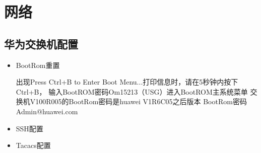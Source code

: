 \documentclass[a4paper,10pt,english]{sphinxmanual}
\begin{document}
\chapter{网络}
\label{\detokenize{network/index:id1}}\label{\detokenize{network/index::doc}}

\section{华为交换机配置}
\label{\detokenize{network/huawei:id1}}\label{\detokenize{network/huawei::doc}}\begin{itemize}
\item {} 
BootRom重置

\begin{sphinxVerbatim}[commandchars=\\\{\}]
出现\PYGZdq{}Press Ctrl+B to Enter Boot Menu...\PYGZdq{}打印信息时，请在5秒钟内按下\PYGZdq{}Ctrl+B\PYGZdq{}，
输入BootROM密码\PYGZdq{}O\PYGZam{}m15213\PYGZdq{}（USG）进入BootROM主系统菜单
交换机V100R005的BootRom密码是huawei
V1R6C05之后版本 BootRom密码Admin@huawei.com
\end{sphinxVerbatim}

\item {} 
SSH配置

\begin{sphinxVerbatim}[commandchars=\\\{\}]
  
   
   
   
   
      
\end{sphinxVerbatim}

\item {} 
Tacacs配置


\end{itemize}
\end{document}
